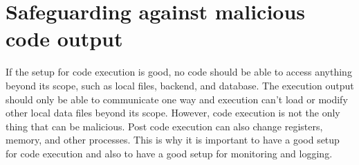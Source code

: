 \section{Safeguarding against malicious code output}
If the setup for code execution is good, no code should be able to access anything beyond its scope, such as local files, backend, and database. The execution output should only be able to communicate one way and execution can't load or modify other local data files beyond its scope. However, code execution is not the only thing that can be malicious. Post code execution can also change registers, memory, and other processes. This is why it is important to have a good setup for code execution and also to have a good setup for monitoring and logging.